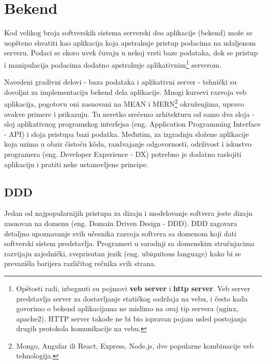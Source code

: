 \documentclass[12pt,oneside]{memoir}
\begin{document}
\chapter{Bekend}
\label{sec:backend}
Kod velikog broja softverskih sistema serverski deo aplikacije (bekend) može se uopšteno shvatiti kao aplikacija koja apstrahuje pristup podacima na udaljenom serveru. Podaci se skoro uvek čuvaju u nekoj vrsti baze podataka, dok se pristup i manipulacija podacima dodatno apstrahuje aplikativnim\footnote{Opštosti radi, izbegnuti su pojmovi \textbf{veb server} i \textbf{http server}. Veb server predstavlja server za dostavljanje statičkog sadržaja na vebu, i često kada govorimo o bekend aplikacijama ne mislimo na ovaj tip servera (nginx, apache2). HTTP server takođe ne bi bio ispravan pojam usled postojanja drugih protokola komunikacije na vebu.} serverom.

Navedeni gradivni delovi - baza podataka i aplikativni server - tehnički su dovoljni za implementaciju bekend dela aplikacije. Mnogi kursevi razvoja veb aplikacija, pogotovu oni zasnovani na MEAN i MERN\footnote{Mongo, Angular ili React, Express, Node.js, dve popularne kombinacije veb tehnologija.} okruženjima, upravo ovakve primere i prikazuju. Tu neretko srećemo arhitekturu od samo dva sloja - sloj aplikativnog programskog interfejsa (eng. Application Programming Interface - API) i sloja pristupa bazi podatka. Međutim, za izgradnju složene aplikacije koja uzima u obzir čistoću k\^{o}da, razdvajanje odgovornosti, održivost i iskustvo programera (eng. Developer Experience - DX) potrebno je dodatno raslojiti aplikaciju i pratiti neke ustanovljene principe.


\section{DDD}
\label{sec:dddsection}
Jedan od najpopularnijih pristupa za dizajn i modelovanje softvera jeste dizajn zasnovan na domenu (eng. Domain Driven Design - DDD). DDD zagovara detaljno upoznavanje svih učesnika razvoja softvera sa domenom koji dati softverski sistem predstavlja. Programeri u saradnji sa domenskim stručnjacima razvijaju zajednički, sveprisutan jezik (eng. ubiquitous language) kako bi se prevazišla barijera različitog rečnika svih strana. \cite{dddq}
\end{document}
